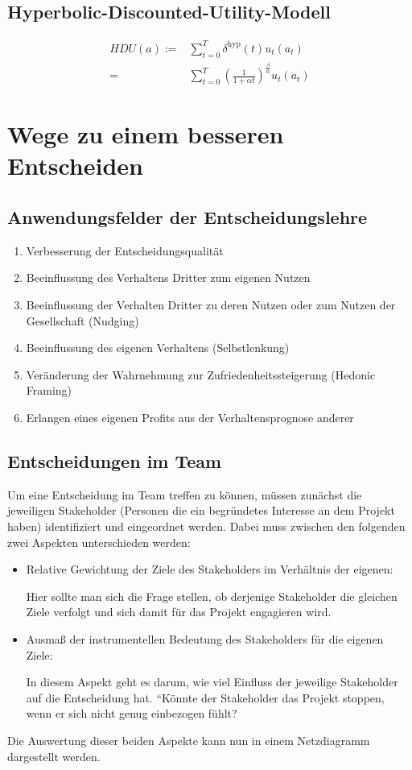 \documentclass[12pt,a4paper]{scrartcl}
\begin{document}
\subsection{Hyperbolic-Discounted-Utility-Modell}
\begin{align*}
	HDU(a) :=& \sum_{t=0}^{T} \delta^\text{hyp}(t)u_t(a_t)\\
	=& \sum_{t=0}^{T} \left(\frac{1}{1+\alpha t}\right)^{\frac{\beta}{\alpha}} u_t(a_t)
\end{align*}

\newpage
\section{Wege zu einem besseren Entscheiden}
\subsection{Anwendungsfelder der Entscheidungslehre \cite{vonNitzsch:211553}}
\begin{enumerate}
	\item Verbesserung der Entscheidungsqualität
	\item Beeinflussung des Verhaltens Dritter zum eigenen Nutzen
	\item Beeinflussung der Verhalten Dritter zu deren Nutzen oder zum Nutzen der Gesellschaft (Nudging)
	\item Beeinflussung des eigenen Verhaltens (Selbstlenkung)
	\item Veränderung der Wahrnehmung zur Zufriedenheitssteigerung (Hedonic Framing)
	\item Erlangen eines eigenen Profits aus der Verhaltensprognose anderer
\end{enumerate}

\subsection{Entscheidungen im Team}
Um eine Entscheidung im Team treffen zu können, müssen zunächst die jeweiligen Stakeholder (Personen die ein begründetes Interesse an dem Projekt haben) identifiziert und eingeordnet werden. Dabei muss zwischen den folgenden zwei Aspekten unterschieden werden:
\begin{itemize}
	\item Relative Gewichtung der Ziele des  Stakeholders im Verhältnis der eigenen:
	
	Hier sollte man sich die Frage stellen, ob derjenige Stakeholder die gleichen Ziele verfolgt und sich damit für das Projekt engagieren wird.
	
	\item Ausmaß der instrumentellen Bedeutung des Stakeholders für die eigenen Ziele:
	
	In diesem Aspekt geht es darum, wie viel Einfluss der jeweilige Stakeholder auf die Entscheidung hat. ``Könnte der Stakeholder das Projekt stoppen, wenn er sich nicht genug einbezogen fühlt?\grqq
\end{itemize}
Die Auswertung dieser beiden Aspekte kann nun in einem Netzdiagramm dargestellt werden.
\end{document}
